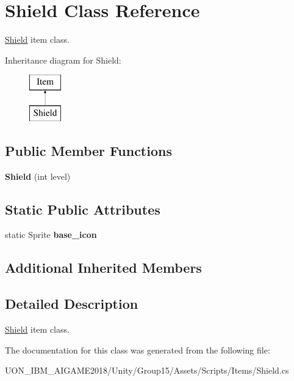 \hypertarget{class_shield}{}\section{Shield Class Reference}
\label{class_shield}


\mbox{\hyperlink{class_shield}{Shield}} item class.  


Inheritance diagram for Shield\+:\begin{figure}[H]
\begin{center}
\leavevmode
\includegraphics[height=2.000000cm]{class_shield}
\end{center}
\end{figure}
\subsection*{Public Member Functions}
\begin{DoxyCompactItemize}
\item 
\mbox{\label{class_shield_a5bd67f14c9a8202223629d8dce2cb9f2}} 
{\bfseries Shield} (int level)
\end{DoxyCompactItemize}
\subsection*{Static Public Attributes}
\begin{DoxyCompactItemize}
\item 
\mbox{\label{class_shield_a6fbc33cc1984c65d8716ead48587c763}} 
static Sprite {\bfseries base\+\_\+icon}
\end{DoxyCompactItemize}
\subsection*{Additional Inherited Members}


\subsection{Detailed Description}
\mbox{\hyperlink{class_shield}{Shield}} item class. 

The documentation for this class was generated from the following file\+:\begin{DoxyCompactItemize}
\item 
U\+O\+N\+\_\+\+I\+B\+M\+\_\+\+A\+I\+G\+A\+M\+E2018/\+Unity/\+Group15/\+Assets/\+Scripts/\+Items/Shield.\+cs\end{DoxyCompactItemize}
